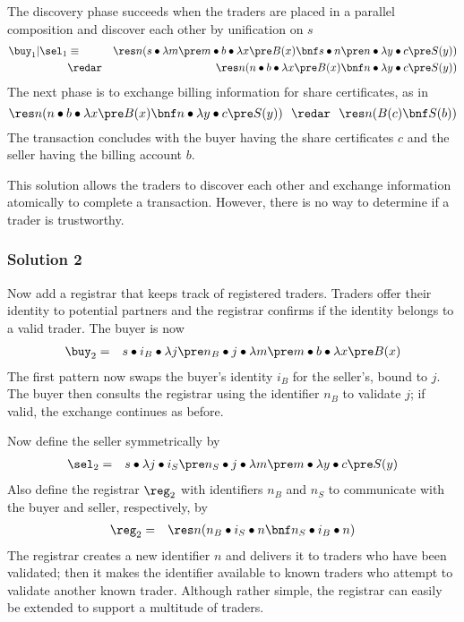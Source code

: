 \documentclass{LMCS}
\renewcommand{\rew}{\redar}
\begin{document}
The discovery phase succeeds when the traders are placed in a parallel
composition and discover each other by unification on $s$
\begin{eqnarray*}
\buy_1|\sel_1
&\equiv&
	\res n (s\bullet \lambda m \pre m\bullet b \bullet \lambda x \pre B(x)
				\bnf	s\bullet n \pre n\bullet \lambda y \bullet c \pre S(y))\\
&\rew&
	\res n (n\bullet b \bullet \lambda x \pre B(x)
				\bnf	n\bullet \lambda y \bullet c \pre S(y)) 
\end{eqnarray*}
The next phase is to exchange billing information for share certificates, as in
$$
\res n (n\bullet b \bullet \lambda x \pre B(x)
				\bnf	n\bullet \lambda y \bullet c \pre S(y))
\ \ \rew\ \ \res n (B(c)\bnf S(b))
$$
The transaction concludes with the buyer having the share
certificates $c$ and the seller having the billing account $b$.

This solution allows the traders to discover each other and exchange
information atomically to complete a transaction. However, there is no way to
determine if a trader is  trustworthy.

\subsubsection*{Solution 2}
\label{sec:example:sol2}
Now add a registrar that keeps track of registered
traders. Traders offer their identity to potential partners
and the registrar confirms if the identity belongs to a valid trader.
The buyer is now
\begin{eqnarray*}
\buy_2 &=&	s\bullet i_B\bullet\lambda j \pre n_B\bullet j\bullet\lambda m \pre 
						m\bullet b\bullet \lambda x \pre B(x) 
\end{eqnarray*}
The first pattern now swaps the buyer's identity $i_B$ for the seller's, 
bound to $j$. The buyer then consults the registrar using the
identifier $n_B$ to validate $j$; if valid, the exchange continues as before.

Now define the seller symmetrically by
\begin{eqnarray*}
\sel_2 &=& s\bullet \lambda j\bullet i_S \pre n_S\bullet j\bullet\lambda m \pre
           m\bullet \lambda y\bullet c\pre S(y) 
\end{eqnarray*}
Also define the registrar $\reg_2$ with identifiers $n_B$ and $n_S$ to
communicate with the buyer and seller, respectively, by
\begin{eqnarray*}
\reg_2 &=& \res n (n_B\bullet{i_S}\bullet n\bnf n_S\bullet{i_B}\bullet n) 
\end{eqnarray*}
The registrar creates a new identifier $n$ and delivers it to traders who
have been validated; then it makes the identifier available to known
traders who attempt to validate another known trader.  Although rather
simple, the registrar can easily be extended to support a multitude of
traders.
\end{document}
